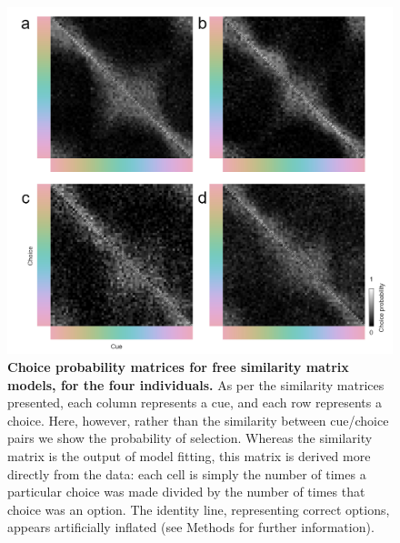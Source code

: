 \documentclass[9pt,biorxiv,lineno,onehalfspacing]{lapreprint}
\begin{document}
\begin{figure}
    \centering
    \begin{fullwidth}
    \includegraphics[width=\textwidth+4cm]{Outputs/Paper/Figures/flat/SI6_choiceMatrices.png}
    \caption{\textbf{Choice probability matrices for free similarity matrix models, for the four individuals.}
    As per the similarity matrices presented, each column represents a cue, and each row represents a choice. 
    Here, however, rather than the similarity between cue/choice pairs we show the probability of selection. 
    Whereas the similarity matrix is the output of model fitting, this matrix is derived more directly from the data: each cell is simply the number of times a particular choice was made divided by the number of times that choice was an option. 
    The identity line, representing correct options, appears artificially inflated (see Methods for further information).
    } 
    \label{fig:choiceProbabilityMatrices}
    \end{fullwidth}
\end{figure}
\end{document}
